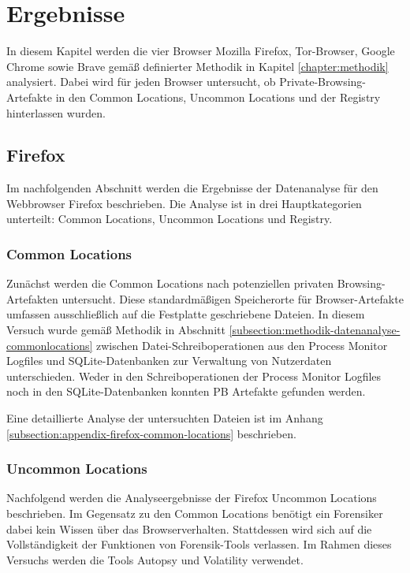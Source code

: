 \chapter{Ergebnisse}
\label{chapter:ergebnisse}

In diesem Kapitel werden die vier Browser Mozilla Firefox, Tor-Browser, Google Chrome sowie Brave gemäß definierter Methodik in Kapitel \ref{chapter:methodik} analysiert. Dabei wird für jeden Browser untersucht, ob Private-Browsing-Artefakte in den Common Locations, Uncommon Locations und der Registry hinterlassen wurden. 


\section{Firefox}
\label{section:ergebnisse-firefox}
Im nachfolgenden Abschnitt werden die Ergebnisse der Datenanalyse für den Webbrowser Firefox beschrieben. Die Analyse ist in drei Hauptkategorien unterteilt: Common Locations, Uncommon Locations und Registry.

\subsection*{Common Locations}
\label{subsection:ergebnisse-firefox-commonlocations}
Zunächst werden die Common Locations nach potenziellen privaten Browsing-Artefakten untersucht. Diese standardmäßigen Speicherorte für Browser-Artefakte umfassen ausschließlich auf die Festplatte geschriebene Dateien. In diesem Versuch wurde gemäß Methodik in Abschnitt \ref{subsection:methodik-datenanalyse-commonlocations} zwischen Datei-Schreiboperationen aus den Process Monitor Logfiles und SQLite-Datenbanken zur Verwaltung von Nutzerdaten unterschieden. Weder in den Schreiboperationen der Process Monitor Logfiles noch in den SQLite-Datenbanken konnten PB Artefakte gefunden werden. 

Eine detaillierte Analyse der untersuchten Dateien ist im Anhang \ref{subsection:appendix-firefox-common-locations} beschrieben.

\subsection*{Uncommon Locations}
\label{subsection:ergebnisse-firefox-uncommonlocations}
Nachfolgend werden die Analyseergebnisse der Firefox Uncommon Locations beschrieben.
Im Gegensatz zu den Common Locations benötigt ein Forensiker dabei kein Wissen über das Browserverhalten. Stattdessen wird sich auf die Vollständigkeit der Funktionen von Forensik-Tools verlassen. Im Rahmen dieses Versuchs werden die Tools Autopsy und Volatility verwendet.

